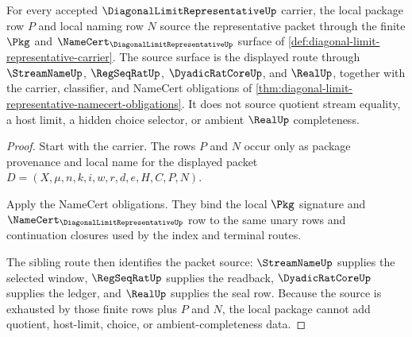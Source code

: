 \begin{theorem}
\label{thm:diagonal-limit-representative-pkg-namecert-source-closure}
For every accepted $\DiagonalLimitRepresentativeUp$ carrier, the local package row $P$ and local naming row $N$ source the representative packet through the finite $\Pkg$ and $\NameCert_{\DiagonalLimitRepresentativeUp}$ surface of \autoref{def:diagonal-limit-representative-carrier}. The source surface is the displayed route through $\StreamNameUp$, $\RegSeqRatUp$, $\DyadicRatCoreUp$, and $\RealUp$, together with the carrier, classifier, and NameCert obligations of \autoref{thm:diagonal-limit-representative-namecert-obligations}. It does not source quotient stream equality, a host limit, a hidden choice selector, or ambient $\RealUp$ completeness.
\end{theorem}
\begin{proof}
Start with the carrier. The rows $P$ and $N$ occur only as package provenance and local name for the displayed packet $D=(X,\mu,n,k,i,w,r,d,e,H,C,P,N)$.

Apply the NameCert obligations. They bind the local $\Pkg$ signature and $\NameCert_{\DiagonalLimitRepresentativeUp}$ row to the same unary rows and continuation closures used by the index and terminal routes.

The sibling route then identifies the packet source: $\StreamNameUp$ supplies the selected window, $\RegSeqRatUp$ supplies the readback, $\DyadicRatCoreUp$ supplies the ledger, and $\RealUp$ supplies the seal row. Because the source is exhausted by those finite rows plus $P$ and $N$, the local package cannot add quotient, host-limit, choice, or ambient-completeness data.
\end{proof}
